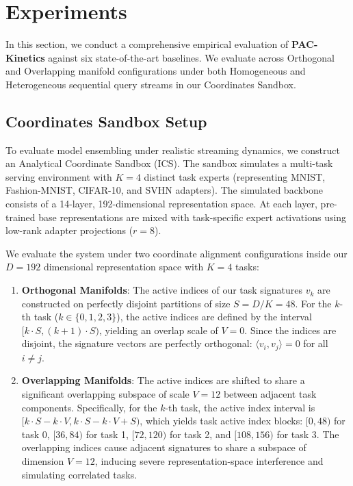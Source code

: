 \section{Experiments}
\label{sec:experiments}

In this section, we conduct a comprehensive empirical evaluation of \textbf{PAC-Kinetics} against six state-of-the-art baselines. We evaluate across Orthogonal and Overlapping manifold configurations under both Homogeneous and Heterogeneous sequential query streams in our Coordinates Sandbox.

\subsection{Coordinates Sandbox Setup}
\label{sec:sandbox_setup}
To evaluate model ensembling under realistic streaming dynamics, we construct an Analytical Coordinate Sandbox (ICS). The sandbox simulates a multi-task serving environment with $K = 4$ distinct task experts (representing MNIST, Fashion-MNIST, CIFAR-10, and SVHN adapters). The simulated backbone consists of a 14-layer, 192-dimensional representation space. At each layer, pre-trained base representations are mixed with task-specific expert activations using low-rank adapter projections ($r = 8$).

We evaluate the system under two coordinate alignment configurations inside our $D = 192$ dimensional representation space with $K = 4$ tasks:
\begin{enumerate}
    \item \textbf{Orthogonal Manifolds}: The active indices of our task signatures $v_k$ are constructed on perfectly disjoint partitions of size $S = D/K = 48$. For the $k$-th task ($k \in \{0, 1, 2, 3\}$), the active indices are defined by the interval $[k \cdot S, (k+1) \cdot S)$, yielding an overlap scale of $V = 0$. Since the indices are disjoint, the signature vectors are perfectly orthogonal: $\langle v_i, v_j \rangle = 0$ for all $i \neq j$.
    \item \textbf{Overlapping Manifolds}: The active indices are shifted to share a significant overlapping subspace of scale $V = 12$ between adjacent task components. Specifically, for the $k$-th task, the active index interval is $[k \cdot S - k \cdot V, k \cdot S - k \cdot V + S)$, which yields task active index blocks: $[0, 48)$ for task 0, $[36, 84)$ for task 1, $[72, 120)$ for task 2, and $[108, 156)$ for task 3. The overlapping indices cause adjacent signatures to share a subspace of dimension $V = 12$, inducing severe representation-space interference and simulating correlated tasks.
\end{enumerate}

